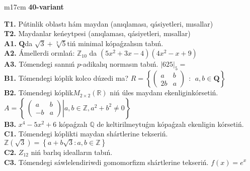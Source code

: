 \documentclass{article}
\begin{document}
\begin{tabular}{m{17cm}}
\textbf{40-variant}
\newline

\textbf{T1.} Pútinlik oblastı hám maydan (anıqlaması, qásiyetleri, mısallar) \\
\textbf{T2.} Maydanlar keńeytpesi (anıqlaması, qásiyetleri, mısallar) \\
\textbf{A1.} \(\mathbf{Q}\)da \(\sqrt{3} + \sqrt[3]{5}\)tiń minimal kópaǵzalısın tabıń. \\
\textbf{A2.} Ámellerdi orınlań: \(\mathbb{Z}_{10}\) da \(\left( 5x^{2} + 3x - 4 \right)\left( 4x^{2} - x + 9 \right)\) \\
\textbf{A3.} Tómendegi sannıń \(p\)-adikalıq normasın tabıń. \(|625|_{5} =\) \\
\textbf{B1.} Tómendegi kóplik kolco dúzedi ma? \(R = \left\{ \begin{pmatrix}
a & b \\
2b & a
\end{pmatrix}\ \ :\ \ a,b \in \mathbf{Q} \right\}\) \\
\textbf{B2.} Tómendegi kóplik\(M_{2 \times 2}\left( \mathbb{R} \right)\) niń úles maydanı ekenliginkórsetiń. \(A = \left\{ \left. \ \begin{pmatrix}
a & b \\
 - b & a
\end{pmatrix} \right|a,b\mathbb{\in Z},a^{2} + b^{2} \neq 0 \right\}\) \\
\textbf{B3.} \(x^{4} - 5x^{2} + 6\) kópaǵzalı \(\mathbb{Q}\) de keltirilmeytuǵın kópaǵzalı ekenligin kórsetiń. \\
\textbf{C1.} Tómendegi kóplikti maydan shártlerine tekseriń. \(\mathbb{Z}\left( \sqrt{3} \right) = \left\{ a + b\sqrt{3}:a,b \in \mathbb{Z} \right\}\) \\
\textbf{C2.} \(Z_{12}\) niń barlıq idealların tabıń. \\
\textbf{C3.} Tómendegi sáwlelendiriwdi gomomorfizm shártlerine tekseriń. \(f(x) = e^{x}\) \\

\end{tabular}
\vspace{1cm}
\end{document}

